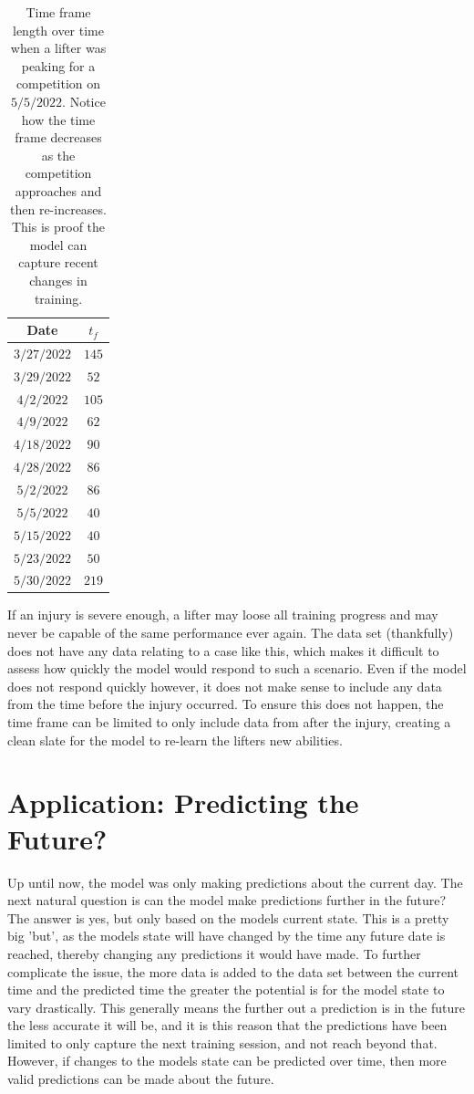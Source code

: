\begin{table}[h]
    \centering
    \begin{tabular}{c|c}
        Date & $t_f$ \\
        \hline
        $3/27/2022$ & $145$ \\
        $3/29/2022$ & $52$ \\
        $4/2/2022$ & $105$ \\
        $4/9/2022$ & $62$ \\
        $4/18/2022$ & $90$ \\
        $4/28/2022$ & $86$ \\
        $5/2/2022$ & $86$ \\
        $5/5/2022$ & $40$ \\
        $5/15/2022$ & $40$ \\
        $5/23/2022$ & $50$ \\
        $5/30/2022$ & $219$
    \end{tabular}
    \caption{Time frame length over time when a lifter was peaking for a competition on $5/5/2022$. Notice how the time frame decreases as the competition approaches and then re-increases. This is proof the model can capture recent changes in training.}
    \label{tab:TimeFrameNearCompetitionDeadlift}
\end{table}

If an injury is severe enough, a lifter may loose all training progress and may never be capable of the same performance ever again. The data set (thankfully) does not have any data relating to a case like this, which makes it difficult to assess how quickly the model would respond to such a scenario. Even if the model does not respond quickly however, it does not make sense to include any data from the time before the injury occurred. To ensure this does not happen, the time frame can be limited to only include data from after the injury, creating a clean slate for the model to re-learn the lifters new abilities.

\section{Application: Predicting the Future?}
\label{sec:TimeFramePredictingTheFuture}

Up until now, the model was only making predictions about the current day. The next natural question is can the model make predictions further in the future? The answer is yes, but only based on the models current state. This is a pretty big 'but', as the models state will have changed by the time any future date is reached, thereby changing any predictions it would have made. To further complicate the issue, the more data is added to the data set between the current time and the predicted time the greater the potential is for the model state to vary drastically. This generally means the further out a prediction is in the future the less accurate it will be, and it is this reason that the predictions have been limited to only capture the next training session, and not reach beyond that. However, if changes to the models state can be predicted over time, then more valid predictions can be made about the future.


